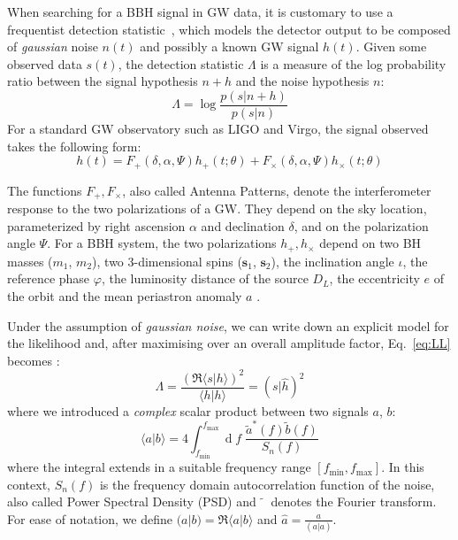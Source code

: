\documentclass[twocolumn,showpacs,preprintnumbers,nofootinbib,prd,
superscriptaddress,10pt]{revtex4-2}
\renewcommand{\d}[1]{\ensuremath{\operatorname{d}\!{#1}}}
\newcommand{\scalar}[2]{\langle #1|#2 \rangle}
\newcommand{\rescalar}[2]{( #1 |#2 )}
\begin{document}
When searching for a BBH signal in GW data, it is customary to use a frequentist detection statistic~\cite{Creighton_book, Maggiore:2007ulw, Harry:2016ijz, Harry:2017weg}, which models the detector output to be composed of {\it gaussian} noise $n(t)$ and possibly a known GW signal $h(t)$.
Given some observed data $s(t)$, the detection statistic $\Lambda$ is a measure of the log probability ratio between the signal hypothesis $n+h$ and the noise hypothesis $n$:
\begin{equation}\label{eq:LL}
	\Lambda = \log\frac{p(s|n+h)}{p(s| n)}
\end{equation}
For a standard GW observatory such as LIGO and Virgo, the signal observed takes the following form:
\begin{equation}\label{eq:signal_model}
	h(t) = F_+(\delta, \alpha, \Psi) h_+(t;\theta) + F_\times(\delta, \alpha, \Psi) h_\times(t;\theta)
\end{equation}

The functions $F_+, F_\times$, also called Antenna Patterns, denote the interferometer response to the two polarizations of a GW. They depend on the sky location, parameterized by right ascension $\alpha$ and declination $\delta$, and on the polarization angle $\Psi$. 
For a BBH system, the two polarizations $h_+, h_\times$ depend on two BH masses ($m_1$, $m_2$), two 3-dimensional spins ($\mathbf{s}_1$, $\mathbf{s}_2$), the inclination angle $\iota$, the reference phase $\varphi$, the luminosity distance of the source $D_L$, the eccentricity $e$ of the orbit and the mean periastron anomaly $a$ \cite{Sathyaprakash_2009}.

Under the assumption of {\it gaussian noise}, we can write down an explicit model for the likelihood and, after maximising over an overall amplitude factor, Eq.~\eqref{eq:LL} becomes \cite{Creighton_book, Maggiore:2007ulw, Harry:2016ijz}:
\begin{equation}\label{eq:LL_gauss}
	\Lambda = \frac{\left(\Re\scalar{s}{h}\right)^2}{\scalar{h}{h}} = \rescalar{s}{\hat{h}}^2
\end{equation}
where we introduced a {\it complex} scalar product between two signals $a$, $b$:
\begin{equation} \label{eq:scalar_product}
	\scalar{a}{b} = 4 \int_{f_\text{min}}^{f_\text{max}} \!\!\!\! \d{f} \; \frac{\tilde{a}^*(f) \tilde{b}(f)}{S_n(f)}
\end{equation}
where the integral extends in a suitable frequency range $[f_\text{min}, f_\text{max}]$.
In this context, $S_n(f)$ is the frequency domain autocorrelation function of the noise, also called Power Spectral Density (PSD) and $\tilde{\phantom{a}}$ denotes the Fourier transform.
For ease of notation, we define ${\rescalar{a}{b} = \Re\scalar{a}{b}}$ and ${\hat{a} = \frac{a}{\rescalar{a}{a}}}$.
\end{document}

